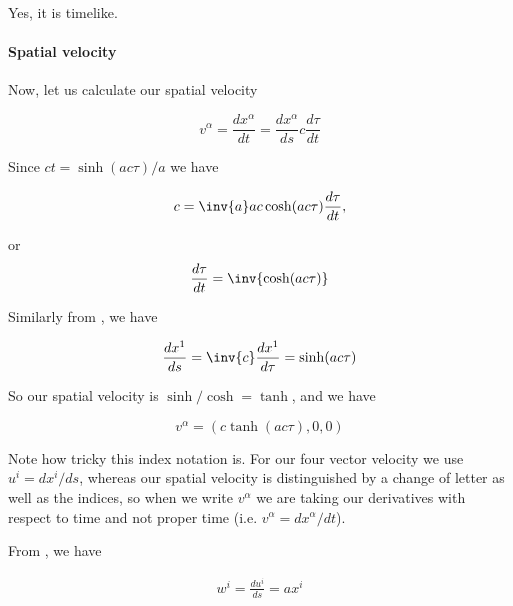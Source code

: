 {Yes, it is timelike.

\paragraph{Spatial velocity}

Now, let us calculate our spatial velocity

\begin{equation}\label{eqn:relativisticElectrodynamicsT2:100}
v^\alpha
= \frac{dx^\alpha}{dt}
=
\frac{dx^\alpha}{ds} c \frac{d\tau}{dt}
\end{equation}

Since \(ct = \sinh( a c \tau )/a\) we have

\begin{equation}\label{eqn:relativisticElectrodynamicsT2:110}
c = \inv{a} a c \cosh( a c \tau ) \frac{d\tau}{dt},
\end{equation}

or
\begin{equation}\label{eqn:relativisticElectrodynamicsT2:110b}
\frac{d\tau}{dt} = \inv{\cosh( a c \tau) }
\end{equation}

Similarly from , we have

\begin{equation}\label{eqn:relativisticElectrodynamicsT2:120}
\frac{dx^1}{ds} = \inv{c} \frac{dx^1}{d\tau} = \sinh( a c \tau )
\end{equation}

So our spatial velocity is \(\sinh/\cosh = \tanh\), and we have

\begin{equation}\label{eqn:relativisticElectrodynamicsT2:130}
v^\alpha = (c \tanh( a c \tau), 0, 0)
\end{equation}

Note how tricky this index notation is.  For our four vector velocity we use \(u^i = dx^i/ds\), whereas our spatial velocity is distinguished by a change of letter as well as the indices, so when we write \(v^\alpha\) we are taking our derivatives with respect to time and not proper time (i.e. \(v^\alpha = dx^\alpha/dt\)).



From , we have

\begin{equation}\label{eqn:relativisticElectrodynamicsT2:2160}
\begin{aligned}
w^i = \frac{ du^i }{ds} = a x^i
\end{aligned}
\end{equation}

}
